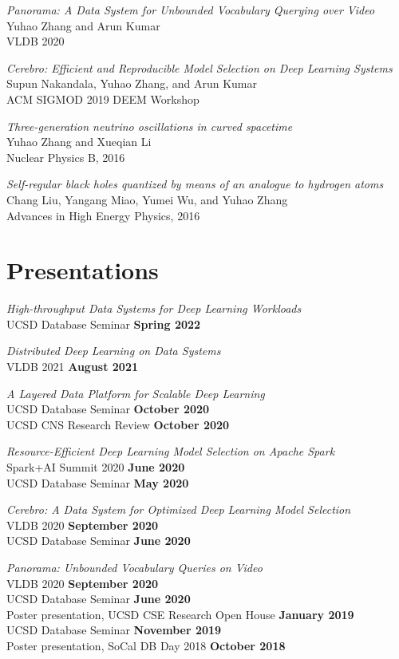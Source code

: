 \documentclass[margin,line]{res}
\begin{document}
\begin{resume}
\textit{Panorama: A Data System for Unbounded Vocabulary Querying over Video}\\
Yuhao Zhang and Arun Kumar\\
VLDB 2020

\textit{Cerebro: Efficient and Reproducible Model Selection on Deep Learning Systems}\\
Supun Nakandala, Yuhao Zhang, and Arun Kumar\\
ACM SIGMOD 2019 DEEM Workshop

\textit{Three-generation neutrino oscillations in curved spacetime}\\
Yuhao Zhang and Xueqian Li\\
Nuclear Physics B, 2016

\textit{Self-regular black holes quantized by means of an analogue to hydrogen atoms}\\
Chang Liu, Yangang Miao, Yumei Wu, and Yuhao Zhang\\
Advances in High Energy Physics, 2016

\section{\sc Presentations}
\textit{High-throughput Data Systems for Deep Learning Workloads}\\
UCSD Database Seminar \hfill {\bf Spring 2022}

\textit{Distributed Deep Learning on Data Systems}\\
VLDB 2021 \hfill {\bf August 2021}

\textit{A Layered Data Platform for Scalable Deep Learning}\\
UCSD Database Seminar \hfill {\bf October 2020}\\
UCSD CNS Research Review \hfill {\bf October 2020}

\vspace{-3mm}
\textit{Resource-Efficient Deep Learning Model Selection on Apache Spark}\\
Spark+AI Summit 2020 \hfill {\bf June 2020}\\
UCSD Database Seminar \hfill {\bf May 2020}

\vspace{-3mm}
\textit{Cerebro: A Data System for Optimized Deep Learning Model Selection}\\
VLDB 2020 \hfill {\bf September 2020}\\
UCSD Database Seminar \hfill {\bf June 2020}

\vspace{-3mm}
\textit{Panorama: Unbounded Vocabulary Queries on Video}\\
VLDB 2020 \hfill {\bf September 2020}\\
UCSD Database Seminar \hfill {\bf June 2020}\\
Poster presentation, UCSD CSE Research Open House \hfill {\bf January 2019}\\
UCSD Database Seminar \hfill {\bf November 2019}\\
Poster presentation, SoCal DB Day 2018 \hfill {\bf October 2018}


\end{resume}
\end{document}
